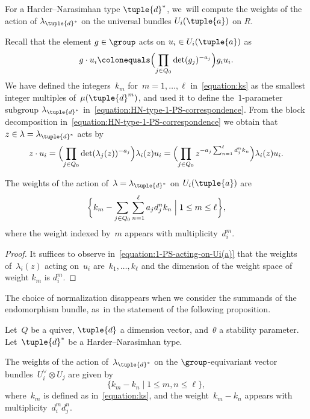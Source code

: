 For a Harder--Narasimhan type $\tuple{d}^*$, we~will compute the weights of the action of $\lambda_{\tuple{d}^*}$
on the universal bundles $U_i(\tuple{a})$ on $R$.

Recall that the element $g \in {\group}$ acts on $u_i \in U_i(\tuple{a})$ as
\begin{equation*}
g \cdot u_i \colonequals \Bigl(\prod_{j \in Q_0} \det(g_j)^{-a_j} \Bigr) g_i u_i.
\end{equation*}
We have defined the integers~$k_m$ for~$m=1,\ldots,\ell$ in~\eqref{equation:ks}
as the smallest integer multiples of~$\mu(\tuple{d}^m)$,
and used it to define the~$1$-parameter subgroup $\lambda_{\tuple{d}^*}$ in~\eqref{equation:HN-type-1-PS-correspondence}.
From the block decomposition in~\eqref{equation:HN-type-1-PS-correspondence}
we obtain that~$z\in\lambda=\lambda_{\tuple{d}^*}$ acts by
\begin{equation}
\label{equation:1-PS-acting-on-Ui(a)}
z \cdot u_i
= \Bigl(\prod_{j\in Q_0}\det(\lambda_j(z))^{-a_j}\Bigr)\lambda_i(z)u_i
= \Bigl(\prod_{j\in Q_0} z^{-a_j\sum_{n=1}^\ell d^n_j k_n}\Bigr) \lambda_i(z) u_i.
\end{equation}

\begin{lemma}
The weights of the action of~$\lambda=\lambda_{\tuple{d}^*}$
on $U_i(\tuple{a})$ are
\begin{equation}
\label{equation:weights-Ui(a)}
\biggl\{ k_m - \sum_{j \in Q_0} \sum_{n=1}^\ell a_j d^n_j k_n \Bigm| 1\leq m \leq \ell \biggr\},
\end{equation}
where the weight indexed by~$m$ appears with multiplicity~$d_i^m$.
\end{lemma}

\begin{proof}
It suffices to observe in~\eqref{equation:1-PS-acting-on-Ui(a)}
that the weights of~$\lambda_i(z)$ acting on~$u_i$ are~$k_1,\ldots,k_\ell$ and the dimension of the weight space of weight $k_m$ is $d_i^m$.
\end{proof}

The choice of normalization disappears when we consider the summands of the endomorphism bundle, as~in the statement of the following proposition.

\begin{proposition}
\label{proposition:weights-endomorphism-summands}
Let~$Q$ be a quiver,
$\tuple{d}$ a dimension vector,
and~$\theta$ a stability parameter.
Let~$\tuple{d}^*$ be a Harder--Narasimhan type.

The weights of the action of~$\lambda_{\tuple{d}^*}$
on the $\group$-equivariant vector bundles~$U_i^\vee\otimes U_j$
are given by
\begin{equation*}
\{ k_m - k_n\mid 1 \leq m,n \leq \ell \},
\end{equation*}
where~$k_m$ is defined as in~\eqref{equation:ks},
and the weight~$k_m-k_n$ appears with multiplicity~$d_i^md_j^n$.
\end{proposition}

